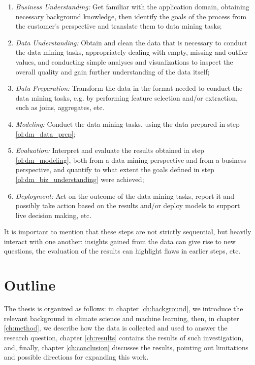 \documentclass[a4paper,11pt]{kth-mag}
\begin{document}
\begin{enumerate}
\item \emph{Business Understanding:} Get familiar with the application domain, obtaining necessary background knowledge, then identify the goals of the process from the customer's perspective and translate them to data mining tasks;
\label{ol:dm_biz_understanding}

\item \emph{Data Understanding:} Obtain and clean the data that is necessary to conduct the data mining tasks, appropriately dealing with empty, missing and outlier values, and conducting simple analyses and visualizations to inspect the overall quality and gain further understanding of the data itself;
\label{ol:dm_data_understanding}

\item \emph{Data Preparation:} Transform the data in the format needed to conduct the data mining tasks, e.g. by performing feature selection and/or extraction, such as joins, aggregates, etc.
\label{ol:dm_data_prep}

\item \emph{Modeling:} Conduct the data mining tasks, using the data prepared in step \ref{ol:dm_data_prep};
\label{ol:dm_modeling}

\item \emph{Evaluation:} Interpret and evaluate the results obtained in step \ref{ol:dm_modeling}, both from a data mining perspective and from a business perspective, and quantify to what extent the goals defined in step \ref{ol:dm_biz_understanding} were achieved;
\label{ol:dm_eval}

\item \emph{Deployment:} Act on the outcome of the data mining tasks, report it and possibly take action based on the results and/or deploy models to support live decision making, etc.
\label{ol:deploy}
\end{enumerate}

It is important to mention that these steps are not strictly sequential, but heavily interact with one another: insights gained from the data can give rise to new questions, the evaluation of the results can highlight flaws in earlier steps, etc.


\section{Outline}
\label{sec:outline}
The thesis is organized as follows: in chapter \ref{ch:background}, we introduce the relevant background in climate science and machine learning, then, in chapter \ref{ch:method}, we describe how the data is collected and used to answer the research question, chapter \ref{ch:results} contains the results of such investigation, and, finally, chapter \ref{ch:conclusion} discusses the results, pointing out limitations and possible directions for expanding this work.
\end{document}
